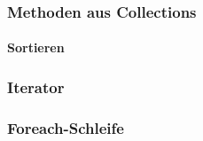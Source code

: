 	\subsubsection{Methoden aus Collections}
		
		\paragraph{Sortieren}
	
	\subsubsection{Iterator}
	
	\subsubsection{Foreach-Schleife}
